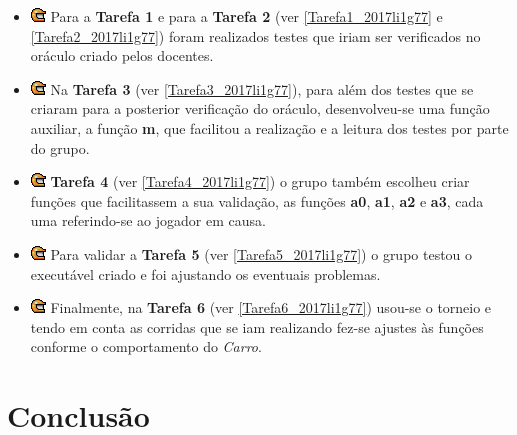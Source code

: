 \documentclass[12pt,a4paper]{report}
\begin{document}
\begin{itemize}

\item[]\includegraphics[scale=0.7]{p3.png} Para a \textbf{Tarefa 1} e para a \textbf{Tarefa 2} (ver \ref{Tarefa1_2017li1g77}  e \ref{Tarefa2_2017li1g77}) foram realizados testes que iriam ser verificados no oráculo criado pelos docentes.

\item[]\includegraphics[scale=0.7]{p3.png} Na \textbf{Tarefa 3} (ver \ref{Tarefa3_2017li1g77}), para além dos testes que se criaram para a posterior verificação do oráculo, desenvolveu-se uma função auxiliar, a função \textbf{m}, que facilitou a realização e a leitura dos testes por parte do grupo.
\item[]\includegraphics[scale=0.7]{p3.png} \textbf{Tarefa 4} (ver \ref{Tarefa4_2017li1g77}) o grupo também escolheu criar funções que facilitassem a sua validação, as funções \textbf{a0}, \textbf{a1}, \textbf{a2} e \textbf{a3}, cada uma referindo-se ao jogador em causa. 

\item[]\includegraphics[scale=0.7]{p3.png} Para validar a \textbf{Tarefa 5} (ver \ref{Tarefa5_2017li1g77}) o grupo testou o executável criado e foi ajustando os eventuais problemas.

\item[]\includegraphics[scale=0.7]{p3.png} Finalmente, na \textbf{Tarefa 6} (ver \ref{Tarefa6_2017li1g77}) usou-se o torneio e tendo em conta as corridas que se iam realizando fez-se ajustes às funções conforme o comportamento do \textit{Carro}.


\end{itemize}

\newpage
\chapter{Conclusão}
\end{document}
